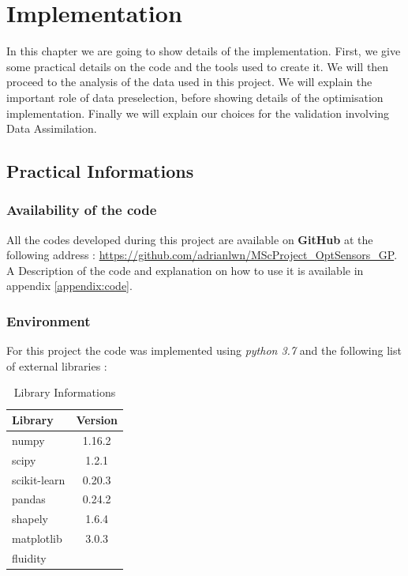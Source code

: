 \chapter{Implementation}


In this chapter we are going to show details of the implementation. First, we give some practical details on the code and the tools used to create it.  We will then proceed to the analysis of the data used in this project. We will explain the important role of data preselection, before showing details of the optimisation implementation. Finally we will explain our choices for the validation involving Data Assimilation. 

\section{Practical Informations}


\subsection{Availability of the code}

All the codes developed during this project are available on \textbf{GitHub} at the following address : \url{https://github.com/adrianlwn/MScProject\_OptSensors\_GP}. A Description of the code and explanation on how to use it is available in appendix \ref{appendix:code}. 


\subsection{Environment}

For this project the code was implemented using \textit{python 3.7} and the following list of external libraries : 

\begin{table}[h!]
\centering
\begin{tabular}{l|c}
\toprule
Library & Version \\ \midrule
numpy & 1.16.2 \\
scipy & 1.2.1\\
scikit-learn & 0.20.3 \\
pandas & 0.24.2 \\
shapely & 1.6.4 \\
matplotlib & 3.0.3\\ 
fluidity &  \\
\bottomrule

\end{tabular}
\caption{Library Informations}
\end{table}

